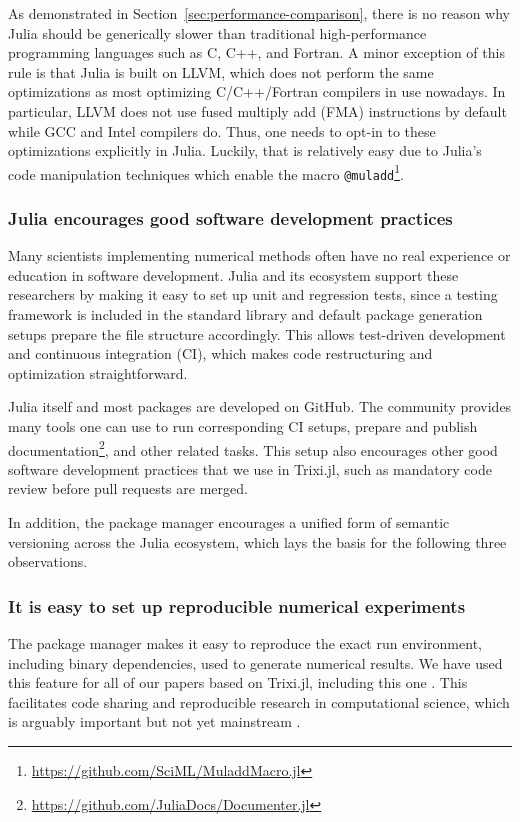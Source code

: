 \documentclass{juliacon}
\newcommand{\trixi}{Trixi.jl\xspace}
\begin{document}
As demonstrated in Section~\ref{sec:performance-comparison}, there is no reason
why Julia should be generically slower than traditional high-performance programming
languages such as C, C++, and Fortran. A minor exception of this rule is that
Julia is built on LLVM, which does not perform the same optimizations as most
optimizing C/C++/Fortran compilers in use nowadays. In particular, LLVM does
not use fused multiply add (FMA) instructions by default while GCC and Intel
compilers do. Thus, one needs to opt-in to these optimizations explicitly in
Julia. Luckily, that is relatively easy due to Julia's code manipulation
techniques which enable the macro \lstinline{@muladd}\footnote{\url{https://github.com/SciML/MuladdMacro.jl}}.

\subsubsection{Julia encourages good software development practices}

Many scientists implementing numerical methods often have no real experience or
education in software development. Julia and its ecosystem support these
researchers by making it easy to set up unit and regression tests, since a
testing framework is included in the standard library and default package
generation setups prepare the file structure accordingly. This allows test-driven
development and continuous integration (CI), which makes code restructuring
and optimization straightforward.

Julia itself and most packages are developed on GitHub. The community provides
many tools one can use to run corresponding CI setups, prepare and publish
documentation\footnote{\url{https://github.com/JuliaDocs/Documenter.jl}},
and other related tasks. This setup also encourages other good software development
practices that we use in \trixi, such as mandatory code review before pull requests
are merged.

In addition, the package manager encourages a unified form of semantic versioning
across the Julia ecosystem, which lays the basis for the following three
observations.

\subsubsection{It is easy to set up reproducible numerical experiments}

The package manager makes it easy to reproduce the exact run environment, including
binary dependencies, used to generate numerical results. We have used this feature for all of our papers based on
\trixi \cite{schlottkelakemper2021purely, ranocha2021preventing}, including this
one \cite{ranocha2021adaptiveRepro}.
This facilitates code sharing and reproducible research in computational science,
which is arguably important but not yet mainstream \cite{barnes2010publish,
donoho2010invitation, leveque2013top}.
\end{document}
